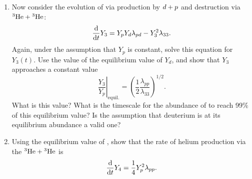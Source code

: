 \begin{exercisebox}
\begin{enumerate}
\item Now consider the evolution of \helium[3] via production by $d+\pt$ and destruction via $\helium[3]+\helium[3]$:
\begin{equation}
\frac{\dif}{\dif t}Y_{3} = Y_{p}Y_{d}\lambda_{pd} - Y_{3}^{2}\lambda_{33}.
\end{equation}
Again, under the assumption that $Y_{p}$ is constant, solve this equation for $Y_{3}(t)$. Use the value of the equilibrium value of $Y_{d}$, and show that $Y_{3}$ approaches a constant value
\[ \left.\frac{Y_{3}}{Y_{p}}\right|_{\mathrm{equil.}} = \left(\frac{1}{2}\frac{\lambda_{pp}}{\lambda_{33}}\right)^{1/2}. \]
What is this value? What is the timescale for the abundance of \helium[3] to reach 99\% of this equilibrium value? Is the assumption that deuterium is at its equilibrium abundance a valid one?
\item Using the equilibrium value of \helium[3], show that the rate of helium production via the $\helium[3]+\helium[3]$ is
\[ \frac{\dif}{\dif t}Y_{4} = \frac{1}{4}Y_{p}^{2}\lambda_{pp}. \]
\end{enumerate}
\end{exercisebox}
